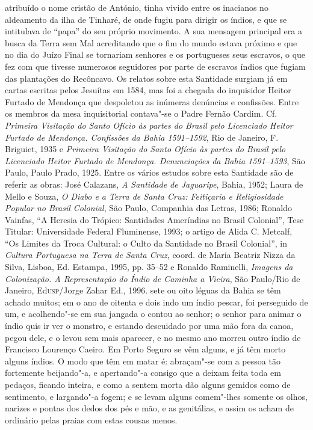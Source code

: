 \begin{linenumbers}
{atribuído o nome cristão de António, tinha vivido entre os inacianos no
aldeamento da ilha de Tinharé, de onde fugiu para dirigir os índios, e
que se intitulava de ``papa'' do seu próprio movimento. A sua mensagem
principal era a busca da Terra sem Mal acreditando que o fim do mundo
estava próximo e que no dia do Juízo Final se tornariam senhores e os
portugueses seus escravos, o que fez com que tivesse numerosos
seguidores por parte de escravos índios que fugiam das plantações do
Recôncavo. Os relatos sobre esta Santidade surgiam já em cartas
escritas pelos Jesuítas em 1584, mas foi a chegada do inquisidor Heitor
Furtado de Mendonça que despoletou as inúmeras denúncias e confissões.
Entre os membros da mesa inquisitorial contava"-se o Padre Fernão
Cardim. Cf. \textit{Primeira Visitação do Santo Ofício às partes do
Brasil pelo Licenciado Heitor Furtado de Mendonça. Confissões da Bahia
1591--1592}, Rio de Janeiro, F. Briguiet, 1935 e \textit{Primeira
Visitação do Santo Ofício às partes do Brasil pelo Licenciado Heitor
Furtado de Mendonça. Denunciações da Bahia 1591--1593}, São Paulo, Paulo
Prado, 1925. Entre os vários estudos sobre esta Santidade são de
referir as obras: José Calazans, \textit{A Santidade de Jaguaripe}, 
Bahia, 1952; Laura de Mello e Souza, \textit{O Diabo e a Terra de
Santa Cruz: Feitiçaria e Religiosidade Popular no Brasil Colonial}, 
São Paulo, Companhia das Letras, 1986; Ronaldo Vainfas, ``A Heresia do 
Trópico: Santidades Ameríndias no Brasil Colonial'', Tese Titular:
Universidade Federal Fluminense, 1993; o artigo de Alida C. Metcalf, ``Os 
Limites da Troca Cultural: o Culto da Santidade no Brasil Colonial'',
in \textit{Cultura Portuguesa na Terra de Santa Cruz}, coord. de Maria
Beatriz Nizza da Silva, Lisboa, Ed. Estampa, 1995, pp. 35--52 e Ronaldo
Raminelli, \textit{Imagens da Colonização. A Representação do Índio de
Caminha a Vieira}, São Paulo/Rio de Janeiro, Ed\textsc{usp}/Jorge Zahar Ed.,
1996.} sete ou oito léguas da Bahia se têm achado muitos; em o ano de
oitenta e dois indo um índio pescar, foi perseguido de um, e
acolhendo"-se em sua jangada o contou ao senhor; o senhor para animar o
índio quis ir ver o monstro, e estando descuidado por uma mão fora da
canoa, pegou dele, e o levou sem mais aparecer, e no mesmo ano morreu
outro índio de Francisco Lourenço Caeiro. Em Porto Seguro se vêm
alguns, e já têm morto alguns índios. O modo que têm em matar é:
abraçam"-se com a pessoa tão fortemente beijando"-a, e apertando"-a
consigo que a deixam feita toda em pedaços, ficando inteira, e como a
sentem morta dão alguns gemidos como de sentimento, e largando"-a fogem;
e se levam alguns comem"-lhes somente os olhos, narizes e pontas dos
dedos dos pés e mão, e as genitálias, e assim os acham de ordinário
pelas praias com estas cousas menos.


\end{linenumbers}
